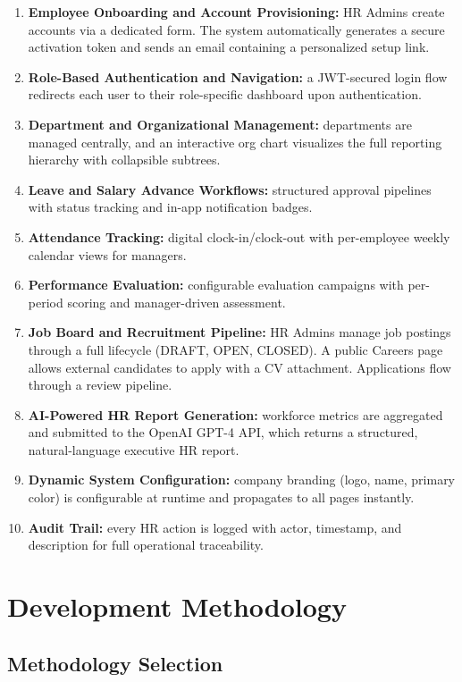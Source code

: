 \documentclass[12pt,a4paper]{report}
\begin{document}
\begin{enumerate}
  \item \textbf{Employee Onboarding and Account Provisioning:} HR Admins create accounts
    via a dedicated form. The system automatically generates a secure activation token and
    sends an email containing a personalized setup link.
  \item \textbf{Role-Based Authentication and Navigation:} a JWT-secured login flow
    redirects each user to their role-specific dashboard upon authentication.
  \item \textbf{Department and Organizational Management:} departments are managed
    centrally, and an interactive org chart visualizes the full reporting hierarchy with
    collapsible subtrees.
  \item \textbf{Leave and Salary Advance Workflows:} structured approval pipelines with
    status tracking and in-app notification badges.
  \item \textbf{Attendance Tracking:} digital clock-in/clock-out with per-employee weekly
    calendar views for managers.
  \item \textbf{Performance Evaluation:} configurable evaluation campaigns with per-period
    scoring and manager-driven assessment.
  \item \textbf{Job Board and Recruitment Pipeline:} HR Admins manage job postings through
    a full lifecycle (DRAFT, OPEN, CLOSED). A public Careers page allows external candidates
    to apply with a CV attachment. Applications flow through a review pipeline.
  \item \textbf{AI-Powered HR Report Generation:} workforce metrics are aggregated and
    submitted to the OpenAI GPT-4 API, which returns a structured, natural-language
    executive HR report.
  \item \textbf{Dynamic System Configuration:} company branding (logo, name, primary
    color) is configurable at runtime and propagates to all pages instantly.
  \item \textbf{Audit Trail:} every HR action is logged with actor, timestamp, and
    description for full operational traceability.
\end{enumerate}

\section{Development Methodology}

\subsection{Methodology Selection}
\end{document}
